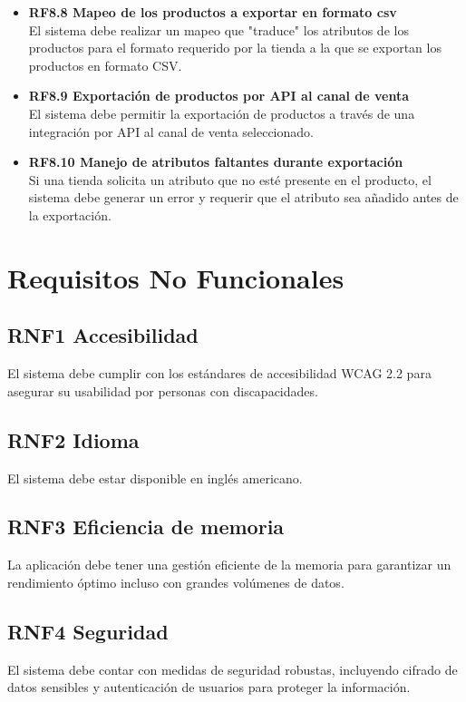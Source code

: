 \documentclass{article}
\begin{document}
\begin{itemize}
    \item \textbf{RF8.8 Mapeo de los productos a exportar en formato csv} \\
    El sistema debe realizar un mapeo que "traduce" los atributos de los productos para el formato requerido por la tienda a la que se exportan los productos en formato CSV.

    \item \textbf{RF8.9 Exportación de productos por API al canal de venta} \\
    El sistema debe permitir la exportación de productos a través de una integración por API al canal de venta seleccionado.

    \item \textbf{RF8.10 Manejo de atributos faltantes durante exportación} \\
    Si una tienda solicita un atributo que no esté presente en el producto, el sistema debe generar un error y requerir que el atributo sea añadido antes de la exportación.
\end{itemize}

\section{Requisitos No Funcionales}
\subsection*{RNF1 Accesibilidad}
El sistema debe cumplir con los estándares de accesibilidad WCAG 2.2 para asegurar su usabilidad por personas con discapacidades.

\subsection*{RNF2 Idioma}
El sistema debe estar disponible en inglés americano.

\subsection*{RNF3 Eficiencia de memoria}
La aplicación debe tener una gestión eficiente de la memoria para garantizar un rendimiento óptimo incluso con grandes volúmenes de datos.

\subsection*{RNF4 Seguridad}
El sistema debe contar con medidas de seguridad robustas, incluyendo cifrado de datos sensibles y autenticación de usuarios para proteger la información.
\end{document}
